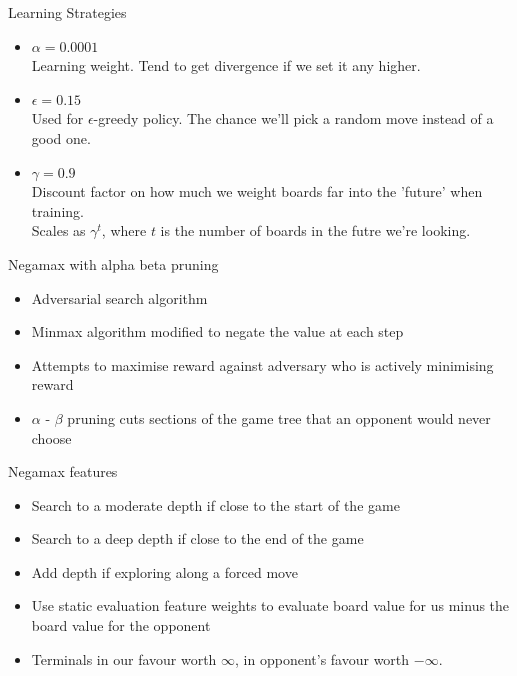 \documentclass{beamer}
\begin{document}
\begin{frame}{Learning Strategies}
\begin{itemize}
	\item $\alpha = 0.0001$
		\\ Learning weight. Tend to get divergence if we set it any higher.
	
	\item $\epsilon = 0.15$
		\\ Used for $\epsilon$-greedy policy. The chance we'll pick a random move instead of a good one.
	\item $\gamma = 0.9$
		\\ Discount factor on how much we weight boards far into the 'future' when training.
		\\ Scales as $\gamma^t$, where $t$ is the number of boards in the futre we're looking.
	\end{itemize}
\end{frame}

\begin{frame}{Negamax with alpha beta pruning}
    \begin{itemize}
  \item
    Adversarial search algorithm
  \item
    Minmax algorithm modified to negate the value at each step
  \item
    Attempts to maximise reward against adversary who is actively minimising reward
  \item
   $\alpha$ - $\beta$ pruning cuts sections of the game tree that an opponent would never choose
  \end{itemize}
\end{frame}

\begin{frame}{Negamax features}
    \begin{itemize}
  \item
    Search to a moderate depth if close to the start of the game
  \item
    Search to a deep depth if close to the end of the game
  \item
    Add depth if exploring along a forced move
  \item
    Use static evaluation feature weights to evaluate board value for us minus the board value for the opponent
  \item
    Terminals in our favour worth $\infty$, in opponent's favour worth $-\infty$.
  \end{itemize}
\end{frame}
\end{document}
